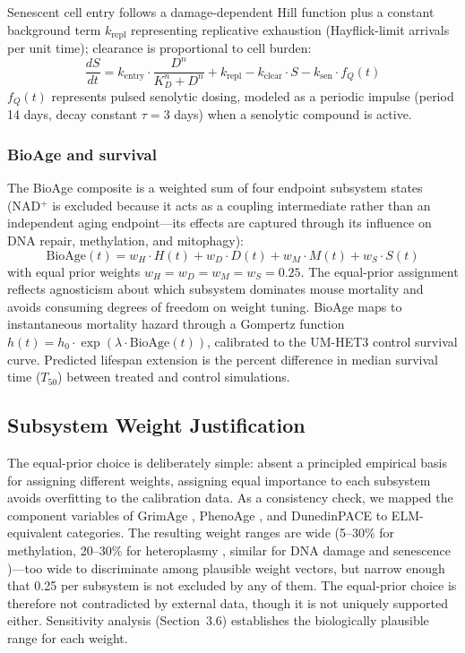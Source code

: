 \documentclass[11pt]{article}
\begin{document}
Senescent cell entry follows a damage-dependent Hill function plus a constant background term $k_{\text{repl}}$ representing replicative exhaustion (Hayflick-limit arrivals per unit time); clearance is proportional to cell burden:
\begin{equation}
\frac{dS}{dt} = k_{\text{entry}} \cdot \frac{D^n}{K_D^n + D^n} + k_{\text{repl}} - k_{\text{clear}} \cdot S - k_{\text{sen}} \cdot f_Q(t)
\end{equation}
$f_Q(t)$ represents pulsed senolytic dosing, modeled as a periodic impulse (period 14 days, decay constant $\tau = 3$ days) when a senolytic compound is active.

\subsubsection{BioAge and survival}

The BioAge composite is a weighted sum of four endpoint subsystem states (NAD$^+$ is excluded because it acts as a coupling intermediate rather than an independent aging endpoint---its effects are captured through its influence on DNA repair, methylation, and mitophagy):
\begin{equation}
\text{BioAge}(t) = w_H \cdot H(t) + w_D \cdot D(t) + w_M \cdot M(t) + w_S \cdot S(t)
\end{equation}
with equal prior weights $w_H = w_D = w_M = w_S = 0.25$. The equal-prior assignment reflects agnosticism about which subsystem dominates mouse mortality and avoids consuming degrees of freedom on weight tuning. BioAge maps to instantaneous mortality hazard through a Gompertz function $h(t) = h_0 \cdot \exp(\lambda \cdot \text{BioAge}(t))$, calibrated to the UM-HET3 control survival curve. Predicted lifespan extension is the percent difference in median survival time ($T_{50}$) between treated and control simulations.

\subsection{Subsystem Weight Justification}

The equal-prior choice is deliberately simple: absent a principled empirical basis for assigning different weights, assigning equal importance to each subsystem avoids overfitting to the calibration data. As a consistency check, we mapped the component variables of GrimAge \citep{Lu2019}, PhenoAge \citep{Levine2018}, and DunedinPACE \citep{Belsky2022} to ELM-equivalent categories. The resulting weight ranges are wide (5--30\% for methylation, 20--30\% for heteroplasmy \citep{Shoubridge2007}, similar for DNA damage and senescence \citep{Ferrucci2020})---too wide to discriminate among plausible weight vectors, but narrow enough that 0.25 per subsystem is not excluded by any of them. The equal-prior choice is therefore not contradicted by external data, though it is not uniquely supported either. Sensitivity analysis (Section~3.6) establishes the biologically plausible range for each weight.
\end{document}
